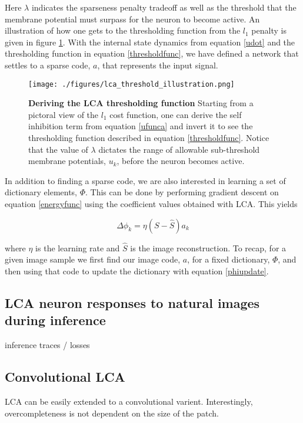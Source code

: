 Here $\lambda$ indicates the sparseness penalty tradeoff as well as the threshold that the membrane potential must surpass for the neuron to become active. An illustration of how one gets to the thresholding function from the $l_{1}$ penalty is given in figure \ref{lca_thresh}. With the internal state dynamics from equation \eqref{udot} and the thresholding function in equation \eqref{thresholdfunc}, we have defined a network that settles to a sparse code, $a$, that represents the input signal.

\begin{figure}\label{lca_thresh}
\centering
\texttt{[image: ./figures/lca\_threshold\_illustration.png]}
\caption{\textbf{Deriving the LCA thresholding function} Starting from a pictoral view of the $l_{1}$ cost function, one can derive the self inhibition term from equation \eqref{ufunca} and invert it to see the thresholding function described in equation \eqref{thresholdfunc}. Notice that the value of $\lambda$ dictates the range of allowable sub-threshold membrane potentials, $u_{k}$, before the neuron becomes active.}
\end{figure}

In addition to finding a sparse code, we are also interested in learning a set of dictionary elements, $\Phi$. This can be done by performing gradient descent on equation \eqref{energyfunc} using the coefficient values obtained with LCA. This yields

\begin{equation}
  \Delta \phi_{k} = \eta (S - \hat{S}) a_{k}
\label{phiupdate}
\end{equation}

where $\eta$ is the learning rate and $\hat{S}$ is the image reconstruction. To recap, for a given image sample we first find our image code, $a$, for a fixed dictionary, $\Phi$, and then using that code to update the dictionary with equation \eqref{phiupdate}.

\subsection{LCA neuron responses to natural images during inference}
inference traces / losses

\subsection{Convolutional LCA}

LCA can be easily extended to a convolutional varient. Interestingly, overcompleteness is not dependent on the size of the patch.


